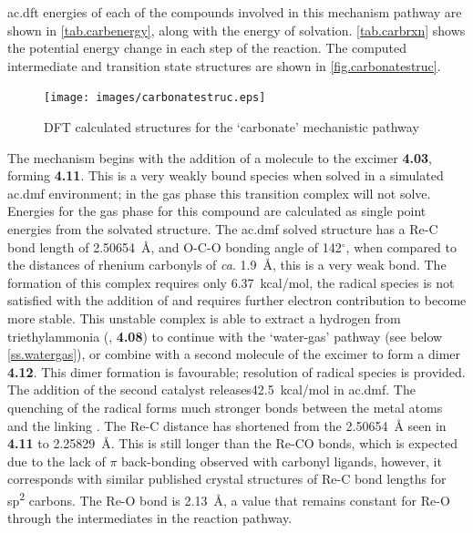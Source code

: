 \Gls{ac.dft} energies of each of the compounds involved in this mechanism pathway are shown in \autoref{tab.carbenergy}, along with the energy of solvation. \autoref{tab.carbrxn} shows the potential energy change in each step of the reaction. The computed intermediate and transition state structures are shown in \autoref{fig.carbonatestruc}. 




\begin{figure}[!htb]
 \begin{center}
  \texttt{[image: images/carbonatestruc.eps]}
 \end{center}
\caption{DFT calculated structures for the `carbonate' mechanistic pathway}
\label{fig.carbonatestruc}
\end{figure} 

The mechanism begins with the addition of a  molecule to the excimer \textbf{4.03}, forming \textbf{4.11}. This is a very weakly bound species when solved in a simulated \gls{ac.dmf} environment; in the gas phase this transition complex will not solve. Energies for the gas phase for this compound are calculated as single point energies from the solvated structure. The \gls{ac.dmf} solved structure has a Re-C bond length of 2.50654~\r{A}, and O-C-O bonding angle of 142$^\circ$, when compared to the  distances of rhenium carbonyls of \textit{ca}. 1.9~\r{A}, this is a very weak bond. The formation of this complex requires only 6.37~kcal/mol, the radical species is not satisfied with the addition of  and requires further electron contribution to become more stable. This unstable complex is able to extract a hydrogen from triethylammonia (, \textbf{4.08}) to continue with the `water-gas' pathway (see below \autoref{ss.watergas}), or combine with a second molecule of the excimer to form a dimer \textbf{4.12}. This dimer formation is favourable; resolution of radical species is provided. The addition of the second catalyst releases42.5~kcal/mol in \gls{ac.dmf}. The quenching of the radical forms much stronger bonds between the metal atoms and the linking . The Re-C distance has shortened from the 2.50654~\r{A} seen in \textbf{4.11} to 2.25829~\r{A}. This is still longer than the Re-CO bonds, which is expected due to the lack of $\pi$ back-bonding observed with carbonyl ligands, however, it corresponds with similar published crystal structures of Re-C bond lengths for sp\textsuperscript{2} carbons\autocite{lukehart1977}. The Re-O bond is 2.13~\r{A}, a value that remains constant for Re-O through the intermediates in the reaction pathway.

